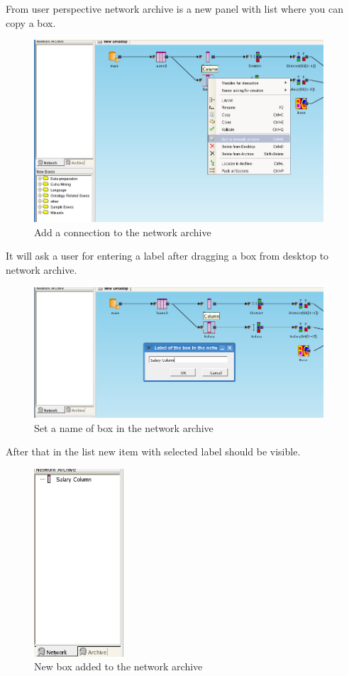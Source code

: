 \documentclass{article}
\begin{document}
From user perspective network archive is a new panel with list where you can copy a box.
\begin{figure}
	\includegraphics[width=10.8cm]{add_to_network_archive}
	\caption{Add a connection to the network archive}
\end{figure}
It will ask a user for entering a label after dragging a box from desktop to network archive.
\begin{figure}
	\includegraphics[width=10.8cm]{set_name_of_box_in_network_archive}
	\caption{Set a name of box in the network archive}
\end{figure}
After that in the list new item with selected label should be visible.
\begin{figure}
	\includegraphics[height=7cm]{network_archive_box_added}
	\caption{New box added to the network archive}
\end{figure}
\end{document}
